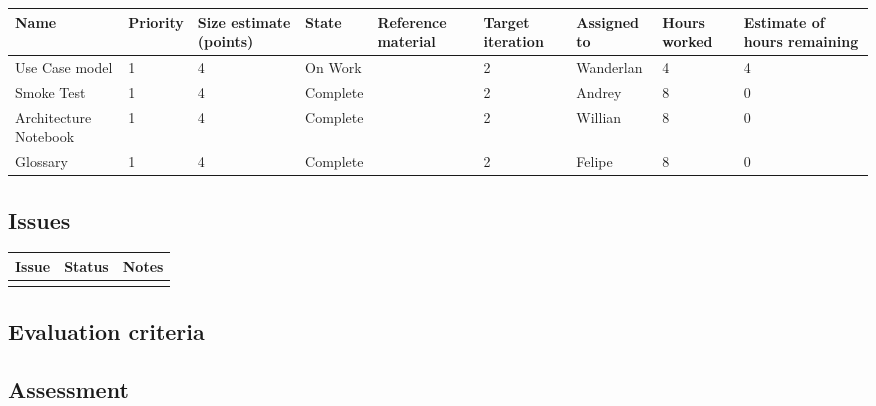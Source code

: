 \begin{adjustbox}{width=\textwidth}
\noindent\begin{tabular}{|l|l|l|l|l|l|l|l|l|}
\hline
Name & Priority & Size estimate (points) & State & Reference material & Target iteration & Assigned to & Hours worked & Estimate of hours remaining \\ \hline
Use Case model & 1 & 4 & On Work & & 2 & Wanderlan & 4 & 4 \\ \hline
Smoke Test & 1 & 4 & Complete & & 2 & Andrey & 8 & 0 \\ \hline
Architecture Notebook & 1 & 4 & Complete & & 2 & Willian & 8 & 0 \\ \hline
Glossary & 1 & 4 & Complete & & 2 & Felipe & 8 & 0 \\ \hline
\end{tabular}
\end{adjustbox}

\subsection*{Issues}


\noindent\begin{tabular}{|l|l|l|}
\hline
Issue & Status & Notes \\
\hline
 &  & \\
\hline
\end{tabular}

\subsection*{Evaluation criteria}



\subsection*{Assessment}
%


